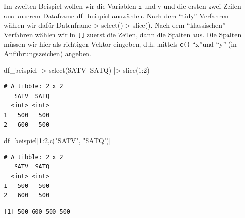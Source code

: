 \documentclass[
  letterpaper,
  DIV=11,
  numbers=noendperiod]{scrreprt}
\newenvironment{Shaded}{\begin{snugshade}}{\end{snugshade}}
\newcommand{\DecValTok}[1]{\textcolor[rgb]{0.68,0.00,0.00}{#1}}
\newcommand{\FunctionTok}[1]{\textcolor[rgb]{0.28,0.35,0.67}{#1}}
\newcommand{\NormalTok}[1]{\textcolor[rgb]{0.00,0.23,0.31}{#1}}
\newcommand{\SpecialCharTok}[1]{\textcolor[rgb]{0.37,0.37,0.37}{#1}}
\newcommand{\StringTok}[1]{\textcolor[rgb]{0.13,0.47,0.30}{#1}}
\begin{document}
Im zweiten Beispiel wollen wir die Variablen x und y und die ersten zwei
Zeilen aus unserem Dataframe df\_beispiel auswählen. Nach dem ``tidy''
Verfahren wählen wir dafür Datenframe \textbar\textgreater{} select()
\textbar\textgreater{} slice(). Nach dem ``klassischen'' Verfahren
wählen wir in \texttt{{[}{]}} zuerst die Zeilen, dann die Spalten aus.
Die Spalten müssen wir hier als richtigen Vektor eingeben, d.h. mittels
\texttt{c()} ``x''und ``y'' (in Anführungszeichen) angeben.

\begin{Shaded}
\begin{Highlighting}[]
\NormalTok{df\_beispiel }\SpecialCharTok{|\textgreater{}} \FunctionTok{select}\NormalTok{(SATV, SATQ) }\SpecialCharTok{|\textgreater{}} \FunctionTok{slice}\NormalTok{(}\DecValTok{1}\SpecialCharTok{:}\DecValTok{2}\NormalTok{)}
\end{Highlighting}
\end{Shaded}

\begin{verbatim}
# A tibble: 2 x 2
   SATV  SATQ
  <int> <int>
1   500   500
2   600   500
\end{verbatim}

\begin{Shaded}
\begin{Highlighting}[]
\NormalTok{df\_beispiel[}\DecValTok{1}\SpecialCharTok{:}\DecValTok{2}\NormalTok{,}\FunctionTok{c}\NormalTok{(}\StringTok{"SATV"}\NormalTok{, }\StringTok{"SATQ"}\NormalTok{)]}
\end{Highlighting}
\end{Shaded}

\begin{verbatim}
# A tibble: 2 x 2
   SATV  SATQ
  <int> <int>
1   500   500
2   600   500
\end{verbatim}

\begin{Shaded}
\end{Shaded}

\begin{verbatim}
[1] 500 600 500 500
\end{verbatim}
\end{document}
